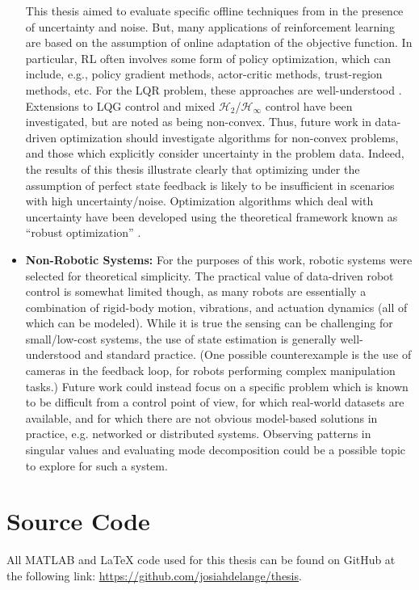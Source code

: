 \begin{itemize}
{This thesis aimed to evaluate specific offline techniques from \cite{de2019formulas} in the presence of uncertainty and noise.  But, many applications of reinforcement learning are based on the assumption of online adaptation of the objective function.  In particular, RL often involves some form of policy optimization, which can include, e.g., policy gradient methods, actor-critic methods, trust-region methods, etc.  For the LQR problem, these approaches are well-understood \cite{malik2019derivative}.  Extensions to LQG control \cite{zheng2022escaping, umenberger2022globally} and mixed $\mathcal{H}_{2}$/$\mathcal{H}_{\infty}$ control \cite{zhang2021derivative, zhang2020policy} have been investigated, but are noted as being non-convex.  Thus, future work in data-driven optimization should investigate algorithms for non-convex problems, and those which explicitly consider uncertainty in the problem data.  Indeed, the results of this thesis illustrate clearly that optimizing under the assumption of perfect state feedback is likely to be insufficient in scenarios with high uncertainty/noise.  Optimization algorithms which deal with uncertainty have been developed using the theoretical framework known as ``robust optimization'' \cite{soyster1973convex, ei1997robust, el1998robust, ben1999robust, ben2001lectures, ben2002robust, bertsimas2003robust, bertsimas2004price, chaerani2006modeling, joelianto5417249}.
}
%
\item{\textbf{Non-Robotic Systems:}
For the purposes of this work, robotic systems were selected for theoretical simplicity.  The practical value of data-driven robot control is somewhat limited though, as many robots are essentially a combination of rigid-body motion, vibrations, and actuation dynamics (all of which can be modeled).  While it is true the sensing can be challenging for small/low-cost systems, the use of state estimation is generally well-understood and standard practice.  (One possible counterexample is the use of cameras in the feedback loop, for robots performing complex manipulation tasks.)  Future work could instead focus on a specific problem which is known to be difficult from a control point of view, for which real-world datasets are available, and for which there are not obvious model-based solutions in practice, e.g. networked or distributed systems.  Observing patterns in singular values and evaluating mode decomposition could be a possible topic to explore for such a system.
}
\end{itemize}

\section{Source Code}
All MATLAB and LaTeX code used for this thesis can be found on GitHub at the following link: \url{https://github.com/josiahdelange/thesis}.
